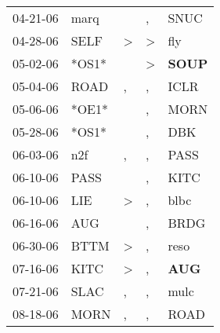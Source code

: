 \begin{supertabular}{p{0.07\textwidth}p{0.06\textwidth}p{0.02\textwidth}p{0.02\textwidth}p{0.06\textwidth}}
          04-21-06\textsuperscript{} &           marq\textsuperscript{} &                  &                , &           SNUC\textsuperscript{} \\
          04-28-06\textsuperscript{} &           SELF\textsuperscript{} &     \textgreater &     \textgreater &            fly\textsuperscript{} \\
          05-02-06\textsuperscript{} &                            *OS1* &                  &     \textgreater &  \textbf{SOUP\textsuperscript{}} \\
          05-04-06\textsuperscript{} &           ROAD\textsuperscript{} &                , &                , &           ICLR\textsuperscript{} \\
          05-06-06\textsuperscript{} &                            *OE1* &                  &                , &           MORN\textsuperscript{} \\
          05-28-06\textsuperscript{} &                            *OS1* &                  &                , &            DBK\textsuperscript{} \\
          06-03-06\textsuperscript{} &            n2f\textsuperscript{} &                , &                , &           PASS\textsuperscript{} \\
          06-10-06\textsuperscript{} &           PASS\textsuperscript{} &                  &                , &           KITC\textsuperscript{} \\
          06-10-06\textsuperscript{} &            LIE\textsuperscript{} &     \textgreater &                , &           blbc\textsuperscript{} \\
          06-16-06\textsuperscript{} &            AUG\textsuperscript{} &                  &                , &           BRDG\textsuperscript{} \\
          06-30-06\textsuperscript{} &           BTTM\textsuperscript{} &     \textgreater &                , &           reso\textsuperscript{} \\
          07-16-06\textsuperscript{} &           KITC\textsuperscript{} &     \textgreater &                , &   \textbf{AUG\textsuperscript{}} \\
          07-21-06\textsuperscript{} &           SLAC\textsuperscript{} &                , &                , &           mulc\textsuperscript{} \\
          08-18-06\textsuperscript{} &           MORN\textsuperscript{} &                , &                , &           ROAD\textsuperscript{} \\

\end{supertabular}
